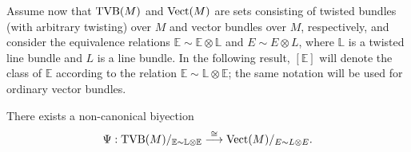Assume now that $\operatorname{TVB}(M)$ and $\operatorname{Vect}(M)$ are sets consisting of twisted bundles (with arbitrary twisting) over $M$ and vector bundles over $M$, respectively, and consider the equivalence relations $\mathbb{E}\sim \mathbb{E}\otimes \mathbb{L}$ and $E\sim E\otimes L$, where $\mathbb{L}$ is a twisted line bundle and $L$ is a line bundle. In the following result, $[\mathbb{E}]$ will denote the class of $\mathbb{E}$ according to the relation $\mathbb{E}\sim \mathbb{L}\otimes \mathbb{E}$; the same notation will be used for ordinary vector bundles.

\begin{theorem}\label{bij_tensor}
There exists a non-canonical biyection
$$\Psi :\operatorname{TVB}(M)/_{\mathbb{E}\sim \mathbb{L}\otimes \mathbb{E}}\stackrel{\cong}{\longrightarrow}\operatorname{Vect}(M)/_{E\sim L\otimes E}.$$
\end{theorem}
